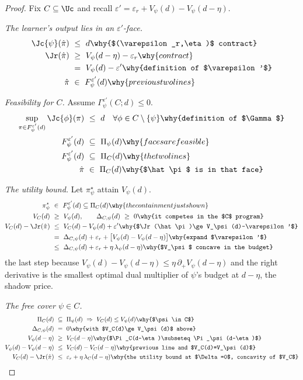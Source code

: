 \begin{proof}
Fix $C\subseteq\Uc$ and recall
$\varepsilon'=\varepsilon_r+V_\psi(d)-V_\psi(d-\eta)$.

\emph{The learner's output lies in an $\varepsilon'$-face.}
\begin{align*}
\Jc{\psi}(\hat\pi)\ &\le\ d \why{$(\varepsilon_r,\eta)$ contract}\\
\Jr(\hat\pi)\ &\ge\ V_\psi(d-\eta)-\varepsilon_r \why{contract}\\
   &=\ V_\psi(d)-\varepsilon' \why{definition of $\varepsilon'$}\\
\hat\pi\ &\in\ F^{\varepsilon'}_\psi(d) \why{previous two lines}
\end{align*}

\emph{Feasibility for $C$.} Assume
$\Gamma^{\varepsilon'}_\psi(C;d)\le0$.
\begin{align*}
\sup_{\pi\in F^{\varepsilon'}_\psi(d)}\Jc{\phi}(\pi)\ &\le\ d
   \quad\forall\phi\in C\setminus\{\psi\} \why{definition of $\Gamma$}\\
F^{\varepsilon'}_\psi(d)\ &\subseteq\ \Pi_\psi(d) \why{faces are feasible}\\
F^{\varepsilon'}_\psi(d)\ &\subseteq\ \Pi_C(d) \why{the two lines}\\
\hat\pi\ &\in\ \Pi_C(d) \why{$\hat\pi$ is in that face}
\end{align*}

\emph{The utility bound.} Let $\pi^\star_\psi$ attain $V_\psi(d)$.
\begin{align*}
\pi^\star_\psi\ &\in\ F^{\varepsilon'}_\psi(d)\subseteq\Pi_C(d)
   \why{the containment just shown}\\
V_C(d)\ &\ge\ V_\psi(d),\qquad \Delta_{C,\psi}(d)\ \ge\ 0
   \why{it competes in the $C$ program}\\
V_C(d)-\Jr(\hat\pi)\ &\le\ V_C(d)-V_\psi(d)+\varepsilon'
   \why{$\Jr(\hat\pi)\ge V_\psi(d)-\varepsilon'$}\\
   &=\ \Delta_{C,\psi}(d)+\varepsilon_r+\big[V_\psi(d)-V_\psi(d-\eta)\big]
   \why{expand $\varepsilon'$}\\
   &\le\ \Delta_{C,\psi}(d)+\varepsilon_r+\eta\,\lambda_\psi(d-\eta)
   \why{$V_\psi$ concave in the budget}
\end{align*}
the last step because $V_\psi(d)-V_\psi(d-\eta)\le\eta\,\partial_+V_\psi(d-\eta)$
and the right derivative is the smallest optimal dual multiplier of $\psi$'s
budget at $d-\eta$, the shadow price.

\emph{The free cover $\psi\in C$.}
\begin{align*}
\Pi_C(d)\ &\subseteq\ \Pi_\psi(d)\ \Rightarrow\ V_C(d)\le V_\psi(d)
   \why{$\psi\in C$}\\
\Delta_{C,\psi}(d)\ &=\ 0 \why{with $V_C(d)\ge V_\psi(d)$ above}\\
V_\psi(d-\eta)\ &\ge\ V_C(d-\eta)
   \why{$\Pi_C(d-\eta)\subseteq\Pi_\psi(d-\eta)$}\\
V_\psi(d)-V_\psi(d-\eta)\ &\le\ V_C(d)-V_C(d-\eta)
   \why{previous line and $V_C(d)=V_\psi(d)$}\\
V_C(d)-\Jr(\hat\pi)\ &\le\ \varepsilon_r+\eta\,\lambda_C(d-\eta)
   \why{the utility bound at $\Delta=0$, concavity of $V_C$}
\end{align*}


\end{proof}
